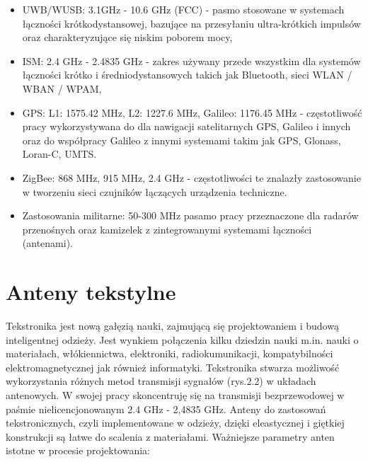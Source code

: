 \begin{itemize}\setlength{\itemsep}{0pt}
	
	\item UWB/WUSB: 3.1GHz - 10.6 GHz (FCC) - pasmo stosowane w systemach łączności krótkodystansowej, bazujące na przesyłaniu ultra-krótkich impulsów oraz charakteryzujące się niskim poborem mocy,

	\item ISM: 2.4 GHz - 2.4835 GHz - zakres używany przede wszystkim dla systemów łączności krótko i średniodystansowych takich jak Bluetooth, sieci WLAN / WBAN / WPAM,

	\item GPS: L1: 1575.42 MHz, L2: 1227.6 MHz, Galileo: 1176.45 MHz - częstotliwość pracy wykorzystywana do dla nawigacji satelitarnych GPS, Galileo i innych oraz do współpracy Galileo z innymi systemami takim jak GPS, Glonass, Loran-C, UMTS.

	\item ZigBee: 868 MHz, 915 MHz, 2.4 GHz - częstotliwości te znalazły zastosowanie w tworzeniu sieci czujników łączących urządzenia techniczne.

	\item Zastosowania militarne: 50-300 MHz pasamo pracy przeznaczone dla radarów przenośnych oraz kamizelek z zintegrowanymi systemami łączności (antenami).

\end{itemize}

\section{Anteny tekstylne}

Tekstronika jest nową gałęzią nauki, zajmującą się projektowaniem i budową inteligentnej odzieży. Jest wynkiem połączenia kilku dziedzin nauki m.in. nauki o materiałach, włókiennictwa, elektroniki, radiokumunikacji, kompatybilności elektromagnetycznej jak również informatyki. Tekstronika stwarza możliwość wykorzystania różnych metod transmisji sygnałów (rys.2.2) w układach antenowych. W swojej pracy skoncentruję się na transmisji bezprzewodowej w paśmie nielicencjonowanym 2.4 GHz - 2,4835 GHz.  
Anteny do zastosowań tekstronicznych, czyli implementowane w odzieży, dzięki eleastycznej i giętkiej konstrukcji są łatwe do scalenia z materiałami. 
Ważniejsze parametry anten istotne w procesie projektowania: 

